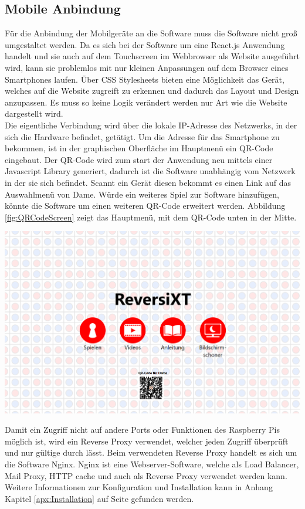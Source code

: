 \documentclass[12pt,a4paper,bibliography=totocnumbered,listof=totocnumbered]{article}
\begin{document}
\subsection{Mobile Anbindung}
Für die Anbindung der Mobilgeräte an die Software muss die Software nicht groß umgestaltet werden. 
Da es sich bei der Software um eine React.js Anwendung handelt und sie auch auf dem Touchscreen im Webbrowser als Website 
ausgeführt wird, kann sie problemlos mit nur kleinen Anpassungen auf dem Browser eines Smartphones laufen.
Über CSS Stylesheets bieten eine Möglichkeit das Gerät, welches auf die Website zugreift zu erkennen und 
dadurch das Layout und Design anzupassen. Es muss so keine Logik verändert werden nur Art wie die Website dargestellt wird.
\\
Die eigentliche Verbindung wird über die lokale IP-Adresse des Netzwerks, in der sich 
die Hardware befindet, getätigt. Um die Adresse für das Smartphone zu bekommen, ist in der graphischen Oberfläche im 
Hauptmenü ein QR-Code eingebaut. Der QR-Code wird zum start der Anwendung neu mittels einer Javascript Library generiert,
dadurch ist die Software unabhängig vom Netzwerk in der sie sich befindet. Scannt ein Gerät diesen bekommt es einen Link auf das Auswahlmenü von Dame. Würde ein weiteres
Spiel zur Software hinzufügen, könnte die Software um einen weiteren QR-Code erweitert werden. 
Abbildung \ref{fig:QRCodeScreen} zeigt das Hauptmenü, mit dem QR-Code unten in der Mitte.

\vspace{1em}
\begin{minipage}{\linewidth}
	\centering
	\includegraphics[width=0.7\linewidth]{pics/mainMenuWithQR.png}
	\label{fig:QRCodeScreen}
\end{minipage}

Damit ein Zugriff nicht auf andere Ports oder Funktionen des Raspberry Pis möglich ist,
wird ein Reverse Proxy verwendet, welcher jeden Zugriff überprüft und nur gültige durch lässt. Beim verwendeten Reverse Proxy handelt 
es sich um die Software Nginx. Nginx ist eine Webserver-Software, welche als Load Balancer, Mail Proxy, HTTP cache und auch 
als Reverse Proxy verwendet werden kann. Weitere Informationen zur Konfiguration und Installation kann in Anhang Kapitel \ref{apx:Installation} 
auf Seite \pageref{apx:Installation} gefunden werden.
\end{document}
